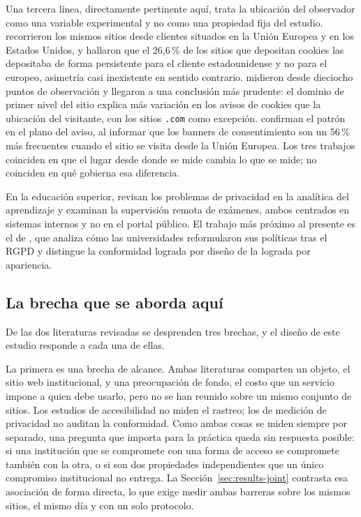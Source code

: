 \documentclass[pdflatex,sn-basic,Numbered]{sn-jnl}
\theoremstyle{thmstyleone}
\theoremstyle{thmstyletwo}
\theoremstyle{thmstylethree}
\begin{document}
Una tercera l\'inea, directamente pertinente aqu\'i, trata la ubicaci\'on del observador como una variable experimental y no como una propiedad fija del estudio. \citet{dabrowski2019measuring} recorrieron los mismos sitios desde clientes situados en la Uni\'on Europea y en los Estados Unidos, y hallaron que el 26,6\,\% de los sitios que depositan cookies las depositaba de forma persistente para el cliente estadounidense y no para el europeo, asimetr\'ia casi inexistente en sentido contrario. \citet{vaneijk2019impact} midieron desde dieciocho puntos de observaci\'on y llegaron a una conclusi\'on m\'as prudente: el dominio de primer nivel del sitio explica m\'as variaci\'on en los avisos de cookies que la ubicaci\'on del visitante, con los sitios \texttt{.com} como excepci\'on. \citet{rasaii2023exploring} confirman el patr\'on en el plano del aviso, al informar que los banners de consentimiento son un 56\,\% m\'as frecuentes cuando el sitio se visita desde la Uni\'on Europea. Los tres trabajos coinciden en que el lugar desde donde se mide cambia lo que se mide; no coinciden en qu\'e gobierna esa diferencia.

En la educaci\'on superior, \citet{liu2023understanding} revisan los problemas de privacidad en la anal\'itica del aprendizaje y \citet{mutimukwe2025privacy} examinan la supervisi\'on remota de ex\'amenes, ambos centrados en sistemas internos y no en el portal p\'ublico. El trabajo m\'as pr\'oximo al presente es el de \citet{munot2025compliance}, que analiza c\'omo las universidades reformularon sus pol\'iticas tras el RGPD y distingue la conformidad lograda por dise\~no de la lograda por apariencia.

\subsection{La brecha que se aborda aqu\'i}\label{sec:related-gap}

De las dos literaturas revisadas se desprenden tres brechas, y el dise\~no de este estudio responde a cada una de ellas.

La primera es una brecha de alcance. Ambas literaturas comparten un objeto, el sitio web institucional, y una preocupaci\'on de fondo, el costo que un servicio impone a quien debe usarlo, pero no se han reunido sobre un mismo conjunto de sitios. Los estudios de accesibilidad no miden el rastreo; los de medici\'on de privacidad no auditan la conformidad. Como ambas cosas se miden siempre por separado, una pregunta que importa para la pr\'actica queda sin respuesta posible: si una instituci\'on que se compromete con una forma de acceso se compromete tambi\'en con la otra, o si son dos propiedades independientes que un \'unico compromiso institucional no entrega. La Secci\'on~\ref{sec:results-joint} contrasta esa asociaci\'on de forma directa, lo que exige medir ambas barreras sobre los mismos sitios, el mismo d\'ia y con un solo protocolo.
\end{document}

